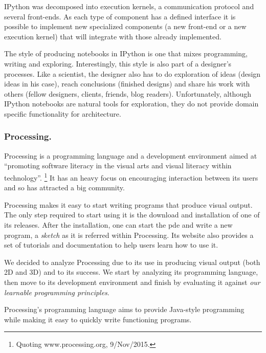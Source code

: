 \documentclass{./llncs2e/llncs}
\begin{document}
	IPython was decomposed into execution kernels, a communication protocol and several front-ends. 
	As each type of component has a defined interface it is possible to implement new specialized components (a new front-end or a new execution kernel) that will integrate with those already implemented.
	
	The style of producing notebooks in IPython is one that mixes programming, writing and exploring. 
	Interestingly, this style is also part of a designer's processes. 
	Like a scientist, the designer also has to do exploration of ideas (design ideas in his case), reach conclusions (finished designs) and share his work with others (fellow designers, clients, friends, blog readers). 
	Unfortunately, although IPython notebooks are natural tools for exploration, they do not provide domain specific functionality for architecture.
	
	
\subsubsection{Processing.}
	Processing\cite{reas2007processing} is a programming language and a development environment aimed at ``promoting software literacy in the visual arts and visual literacy within technology''.
	\footnote{Quoting www.processing.org, 9/Nov/2015.}
	It has an heavy focus on encouraging interaction between its users and so has attracted a big community.
	
	Processing makes it easy to start writing programs that produce visual output. 
	The only step required to start using it is the download and installation of one of its releases. 
	After the installation, one can start the \ac{pde} and write a new program, a \emph{sketch} as it is referred within Processing. 
	Its website also provides a set of tutorials and documentation to help users learn how to use it.
	
	We decided to analyze Processing due to its use in producing visual output (both 2D and 3D) and to its success.
	We start by analyzing its programming language, then move to its development environment and finish by evaluating it against \emph{our learnable programming principles}.
	
	Processing's programming language aims to provide Java-style programming while making it easy to quickly write functioning programs. 
	
\end{document}

